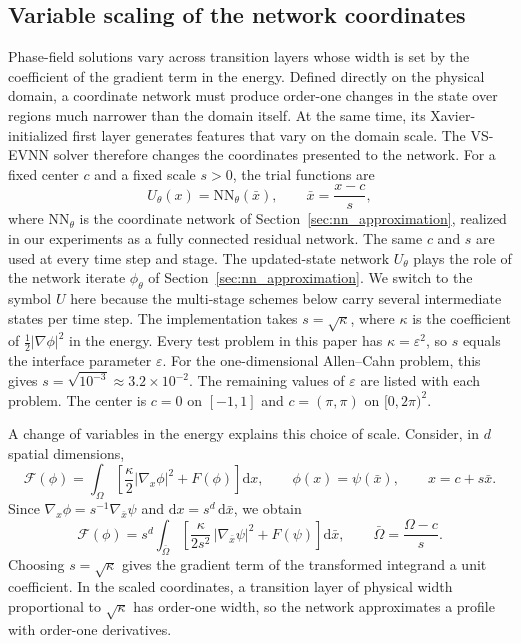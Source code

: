 \documentclass[11pt,letterpaper]{article}
\theoremstyle{plain}
\theoremstyle{definition}
\newcommand{\grad}{\nabla}%
\newcommand{\E}{\mathcal{F}}
\newcommand{\dd}{\mathrm{d}}
\begin{document}
\subsection{Variable scaling of the network coordinates}
\label{subsec:variable-scaling}\label{subsec:scaled-network-class}
Phase-field solutions vary across transition layers whose width is set by the coefficient of the gradient term in the energy. Defined directly on the physical domain, a coordinate network must produce order-one changes in the state over regions much narrower than the domain itself. At the same time, its Xavier-initialized first layer generates features that vary on the domain scale. The VS-EVNN solver therefore changes the coordinates presented to the network. For a fixed center \(c\) and a fixed scale \(s>0\), the trial functions are
\begin{equation}
U_\theta(x)=\mathrm{NN}_\theta(\bar{x}),
\qquad
\bar{x}=\frac{x-c}{s},
\label{eq:scaled-coordinate-network}
\end{equation}
where \(\mathrm{NN}_\theta\) is the coordinate network of Section~\ref{sec:nn_approximation}, realized in our experiments as a fully connected residual network. The same \(c\) and \(s\) are used at every time step and stage. The updated-state network \(U_\theta\) plays the role of the network iterate \(\phi_\theta\) of Section~\ref{sec:nn_approximation}. We switch to the symbol \(U\) here because the multi-stage schemes below carry several intermediate states per time step. The implementation takes \(s=\sqrt{\kappa}\), where \(\kappa\) is the coefficient of \(\frac12|\grad\phi|^2\) in the energy. Every test problem in this paper has \(\kappa=\varepsilon^2\), so \(s\) equals the interface parameter \(\varepsilon\). For the one-dimensional Allen--Cahn problem, this gives \(s=\sqrt{10^{-3}}\approx3.2\times10^{-2}\). The remaining values of \(\varepsilon\) are listed with each problem. The center is \(c=0\) on \([-1,1]\) and \(c=(\pi,\pi)\) on \([0,2\pi)^2\).

A change of variables in the energy explains this choice of scale. Consider, in \(d\) spatial dimensions,
\[
\E(\phi)=\int_{\Omega}\left[\frac{\kappa}{2}|\grad_x\phi|^2+F(\phi)\right]\dd x,
\qquad
\phi(x)=\psi(\bar{x}),
\qquad
x=c+s\bar{x}.
\]
Since \(\grad_x\phi=s^{-1}\grad_{\bar{x}}\psi\) and \(\dd x=s^d\,\dd\bar{x}\), we obtain
\begin{equation}
\E(\phi)
=s^d\int_{\bar\Omega}
\left[
\frac{\kappa}{2s^2}\,|\grad_{\bar{x}}\psi|^2
+F(\psi)
\right]\dd\bar{x},
\qquad
\bar\Omega=\frac{\Omega-c}{s}.
\label{eq:scaled-energy}
\end{equation}
Choosing \(s=\sqrt{\kappa}\) gives the gradient term of the transformed integrand a unit coefficient. In the scaled coordinates, a transition layer of physical width proportional to \(\sqrt{\kappa}\) has order-one width, so the network approximates a profile with order-one derivatives.
\end{document}
